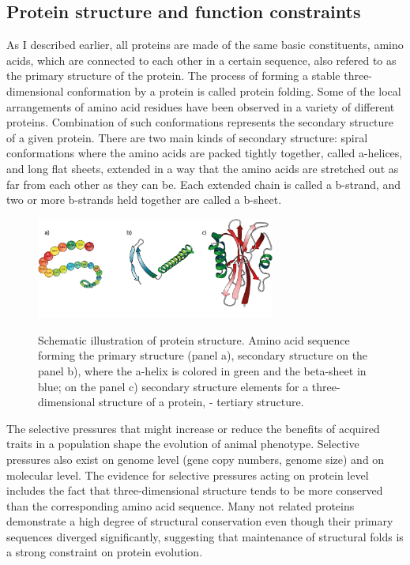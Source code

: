 \documentclass[11pt, a4paper,oneside]{report}
\begin{document}
\subsection{Protein structure and function constraints}
As I described earlier,  all proteins are made of the
same basic constituents, amino acids, which are connected to each other in a certain sequence, also refered to as the primary structure of the protein. The process of forming a stable three-dimensional conformation by a protein is called protein folding. 
 Some of the local arrangements of amino acid residues have been observed in a variety of different proteins.  Combination of such conformations represents the secondary structure of a given protein.  There are two main kinds of secondary structure: spiral conformations where the amino acids are packed tightly together, called a-helices, and long flat sheets, extended in a way that the amino acids are stretched out as far from each other as they can be. Each extended chain is called a b-strand, and two or more b-strands held together are called a b-sheet.

\begin{figure}[t]
\begin{center}
\label{img:populations}
\includegraphics[width=0.7\textwidth]{figures/protein_structure.png}
\end{center}
\caption{Schematic illustration of protein structure. Amino acid sequence forming the primary structure (panel a), secondary structure on the panel b), where the a-helix is colored in green and the beta-sheet in blue; on the panel c) secondary structure elements for a three-dimensional structure of a protein, - tertiary structure.} 
\end{figure}

The selective pressures that might increase or reduce the benefits of acquired traits in a population shape the evolution of animal phenotype. Selective pressures also exist on genome level (gene copy numbers, genome size) and on molecular level. The evidence for selective pressures acting on protein level includes the fact that three-dimensional structure tends to be more conserved than the corresponding amino acid sequence\cite{Illergard2009}.  Many not related proteins demonstrate a high degree of structural conservation even though their primary sequences diverged significantly, suggesting that maintenance of structural folds is a strong constraint on protein evolution\cite{Sousounis2012}. 
\end{document}
